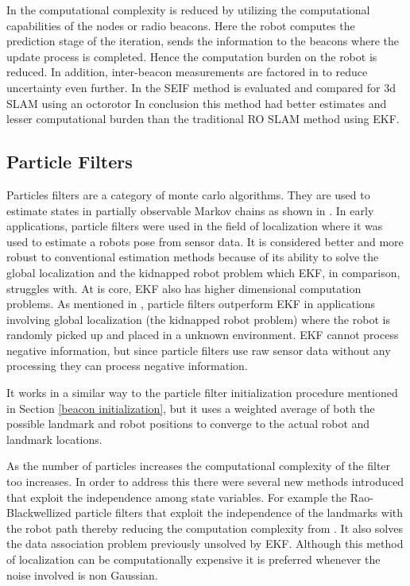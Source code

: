 \documentclass[conference]{IEEEtran}
\begin{document}
In \cite{Torres-Gonzalez2014} the computational complexity is reduced by utilizing the computational capabilities of the nodes or radio  beacons. Here the robot computes the prediction stage of the iteration, sends the information to the beacons where the update process is completed. Hence the computation burden on the robot is reduced. In addition, inter-beacon measurements are factored in to reduce uncertainty even further. In \cite{Torres-Gonzalez2017} the SEIF method is evaluated and compared for 3d SLAM using an octorotor In conclusion this method had better estimates and lesser computational burden than the traditional RO SLAM method using EKF. 



	
	
	

	
\subsection{Particle Filters}      %
Particles filters are a category of monte carlo algorithms. They are used to estimate states in partially observable Markov chains as shown in \cite{Doucet2001}. In  early applications, particle filters were used in the field of localization where it was used to estimate a robots pose from sensor data. It is considered better and more robust to conventional estimation methods because of its ability to solve the global localization \cite{Borenstein1996} and the kidnapped robot problem \cite{Engelson1992} which EKF, in comparison, struggles with. At is core, EKF also has higher dimensional computation problems.
As mentioned in \cite{Thrun2002a}, particle filters outperform EKF in applications involving global localization (the kidnapped robot problem) where the robot is randomly picked up and placed in a unknown environment. 
EKF cannot process negative information, but since particle filters use raw sensor data without any processing they can process negative information\cite{Thrun2002a}. 

It works in a similar way to the particle filter initialization procedure mentioned in Section \ref{beacon initialization}, but it uses a weighted average of both the possible landmark and robot positions to converge to the actual robot and landmark locations.

As the number of particles increases the computational complexity of the filter too increases. In order to address this there were several new methods introduced that  exploit the independence among state variables. For example the Rao-Blackwellized particle filters that exploit the independence of the landmarks with the robot path thereby reducing the computation complexity from \cite{Yuan2012}. It also solves the data association problem previously unsolved by EKF. Although this method of localization can be computationally expensive it is preferred whenever the noise involved is non Gaussian.
	
\end{document}

